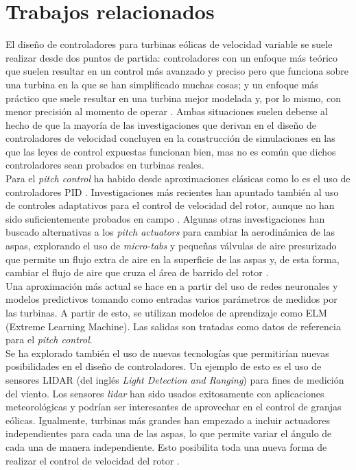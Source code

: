 \section{Trabajos relacionados}
{\parindent0pt 
El diseño de controladores para turbinas eólicas de velocidad variable se suele realizar desde dos puntos de partida: controladores con un enfoque más teórico que suelen resultar en un control más avanzado y preciso pero que funciona sobre una turbina en la que se han simplificado muchas cosas; y un enfoque más práctico que suele resultar en una turbina mejor modelada y, por lo mismo, con menor precisión al momento de operar \cite{Johnson2004}. Ambas situaciones suelen deberse al hecho de que la mayoría de las investigaciones que derivan en el diseño de controladores de velocidad concluyen en la construcción de simulaciones en las que las leyes de control expuestas funcionan bien, mas no es común que dichos controladores sean probados en turbinas reales.
\\

Para el \emph{pitch control} ha habido desde aproximaciones clásicas como lo es el uso de controladores PID \cite{Johnson2004}. Investigaciones más recientes han apuntado también al uso de controles adaptativos para el control de velocidad del rotor, aunque no han sido suficientemente probados en campo \cite{Johnson2004}. Algunas otras investigaciones han buscado alternativas a los \emph{pitch actuators} para cambiar la aerodinámica de las aspas, explorando el uso de \emph{micro-tabs} y pequeñas válvulas de aire presurizado que permite un flujo extra de aire en la superficie de las aspas y, de esta forma, cambiar el flujo de aire que cruza el área de barrido del rotor \cite{Pao2009}.
\\

Una aproximación más actual se hace en \cite{Jie2020} a partir del uso de redes neuronales y modelos predictivos tomando como entradas varios parámetros de medidos por las turbinas. A partir de esto, se utilizan modelos de aprendizaje como ELM (Extreme Learning Machine). Las salidas son tratadas como datos de referencia para el \emph{pitch control}.
\\

Se ha explorado también el uso de nuevas tecnologías que permitirían nuevas posibilidades en el diseño de controladores. Un ejemplo de esto es el uso de sensores LIDAR (del inglés \emph{Light Detection and Ranging}) para fines de medición del viento. Los sensores \emph{lidar} han sido usados exitosamente con aplicaciones meteorológicas y podrían ser interesantes de aprovechar en el control de granjas eólicas. Igualmente, turbinas más grandes han empezado a incluir actuadores independientes para cada una de las aspas, lo que permite variar el ángulo de cada una de manera independiente. Esto posibilita toda una nueva forma de realizar el control de velocidad del rotor \cite{Pao2009}. 

}


